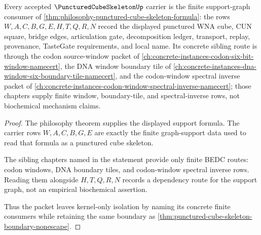 \begin{theorem}\label{thm:punctured-cube-skeleton-philosophy-route}
Every accepted $\PuncturedCubeSkeletonUp$ carrier is the finite support-graph consumer of \autoref{thm:philosophy-punctured-cube-skeleton-formula}: the rows $W,A,C,B,G,E,H,T,Q,R,N$ record the displayed punctured WNA cube, CUN square, bridge edges, articulation gate, decomposition ledger, transport, replay, provenance, TasteGate requirements, and local name. Its concrete sibling route is through the codon source-window packet of \autoref{ch:concrete-instances-codon-six-bit-window-namecert}, the DNA window boundary tile of \autoref{ch:concrete-instances-dna-window-six-boundary-tile-namecert}, and the codon-window spectral inverse packet of \autoref{ch:concrete-instances-codon-window-spectral-inverse-namecert}; those chapters supply finite window, boundary-tile, and spectral-inverse rows, not biochemical mechanism claims.
\end{theorem}
\begin{proof}
The philosophy theorem supplies the displayed support formula. The carrier rows $W,A,C,B,G,E$ are exactly the finite graph-support data used to read that formula as a punctured cube skeleton.

The sibling chapters named in the statement provide only finite BEDC routes: codon windows, DNA boundary tiles, and codon-window spectral inverse rows. Reading them alongside $H,T,Q,R,N$ records a dependency route for the support graph, not an empirical biochemical assertion.

Thus the packet leaves kernel-only isolation by naming its concrete finite consumers while retaining the same boundary as \autoref{thm:punctured-cube-skeleton-boundary-nonescape}.
\end{proof}




